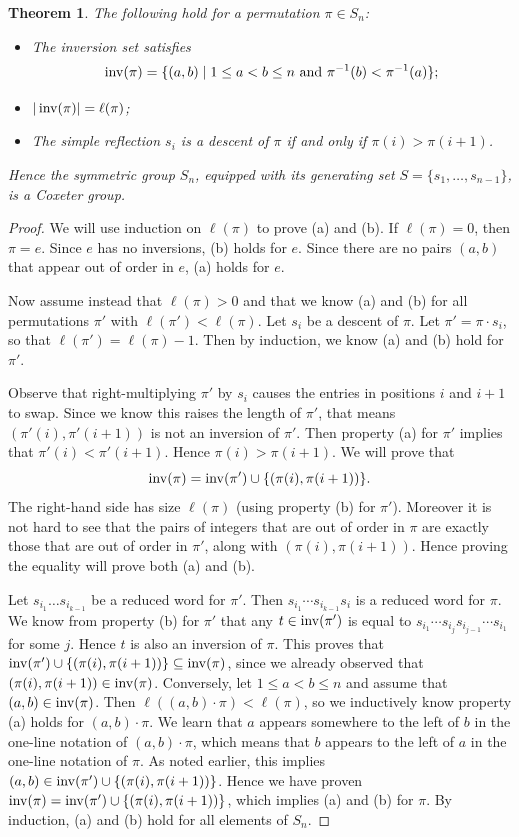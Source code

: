 \documentclass{article}
\numberwithin{equation}{section}
\newtheorem{theorem}{Theorem}[section]
\theoremstyle{remark}
\theoremstyle{definition}
\begin{document}
	\begin{theorem}
		The following hold for a permutation $\pi \in S_n$:
		\begin{itemize}
		\item[(a)] The inversion set satisfies \[ \operatorname{inv}(\pi) = \{ (a,b) \mid 1\leq a < b \leq n\text{ and $ \pi^{-1}(b)<\pi^{-1}(a)$} \}; \]
		\item[(b)] $|\operatorname{inv}(\pi)|= \ell(\pi)$;
		\item[(c)]  The simple reflection $s_i$ is a descent of $\pi$ if and only if $\pi(i)>\pi(i+1)$.
		\end{itemize}
		Hence the symmetric group $S_n$, equipped with its generating set $S=\{s_1,\ldots,s_{n-1}\}$, is a Coxeter group.
	\end{theorem}
	\begin{proof}
		We will use induction on $\ell(\pi)$ to prove (a) and (b). If $\ell(\pi)=0$, then $\pi=e$. Since $e$ has no inversions, (b) holds for $e$. Since there are no pairs $(a,b)$ that appear out of order in $e$, (a) holds for $e$. 
		
		Now assume instead that $\ell(\pi)>0$ and that we know (a) and (b) for all permutations $\pi'$ with $\ell(\pi')<\ell(\pi)$. Let $s_i$ be a descent of $\pi$. Let $\pi'=\pi\cdot s_i$, so that $\ell(\pi')=\ell(\pi)-1$. Then by induction, we know (a) and (b) hold for $\pi'$. 
		
		Observe that right-multiplying $\pi'$ by $s_i$ causes the entries in positions $i$ and $i+1$ to swap. Since we know this raises the length of $\pi'$, that means $(\pi'(i),\pi'(i+1))$ is not an inversion of $\pi'$. Then property (a) for $\pi'$ implies that $\pi'(i) < \pi'(i+1)$. Hence $\pi(i)>\pi(i+1)$.  We will prove that
		\[ \operatorname{inv}(\pi) = \operatorname{inv}(\pi') \cup \{ (\pi(i), \pi(i+1)) \}. \]
		The right-hand side has size $\ell(\pi)$ (using property (b) for $\pi'$). Moreover it is not hard to see that the pairs of integers that are out of order in $\pi$ are exactly those that are out of order in $\pi'$, along with $(\pi(i),\pi(i+1))$. Hence proving the equality will prove both (a) and (b).
		
		Let $s_{i_1}\ldots s_{i_{k-1}}$ be a reduced word for $\pi'$. Then $s_{i_1}\cdots s_{i_{k-1}}s_i$ is a reduced word for $\pi$. We know from property (b) for $\pi'$ that any $t\in \operatorname{inv}(\pi')$ is equal to $s_{i_1}\cdots s_{i_j}s_{i_{j-1}}\cdots s_{i_1}$ for some $j$. Hence $t$ is also an inversion of $\pi$. This proves that $\operatorname{inv}(\pi')\cup \{(\pi(i),\pi(i+1))\}\subseteq \operatorname{inv}(\pi)$, since we already observed that $(\pi(i),\pi(i+1))\in \operatorname{inv}(\pi)$. Conversely, let $1\leq a < b \leq n$ and assume that $(a,b)\in \operatorname{inv}(\pi)$. Then $\ell((a,b)\cdot \pi)<\ell(\pi)$, so we inductively know property (a) holds for $(a,b)\cdot \pi$. We learn that $a$ appears somewhere to the left of $b$ in the one-line notation of $(a,b)\cdot \pi$, which means that $b$ appears to the left of $a$ in the one-line notation of $\pi$. As noted earlier, this implies $(a,b) \in \operatorname{inv}(\pi')\cup\{(\pi(i), \pi(i+1))\}$. Hence we have proven $\operatorname{inv}(\pi) = \operatorname{inv}(\pi') \cup \{ (\pi(i), \pi(i+1)) \}$, which implies (a) and (b) for $\pi$. By induction, (a) and (b) hold for all elements of $S_n$. 
		

\end{proof}
\end{document}

